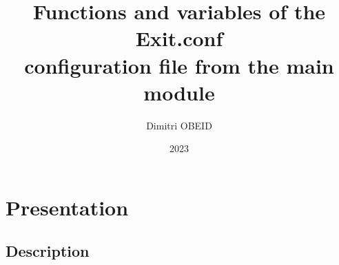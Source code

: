 \documentclass[a4paper,10pt]{article}
\title{\color{sec1}Functions and variables of the \color{path}Exit.conf\color{sec1}\\configuration file from the main module}\color{text}
\author{Dimitri OBEID}
\date{2023}
\begin{document}
    \maketitle
    \newpage

    \hypertarget{contents}{}
    \tableofcontents
    \newpage

    \color{sec1}
    \section{Presentation}\color{text}

    \color{sec2}
    \subsection{Description}\color{text}
\end{document}
